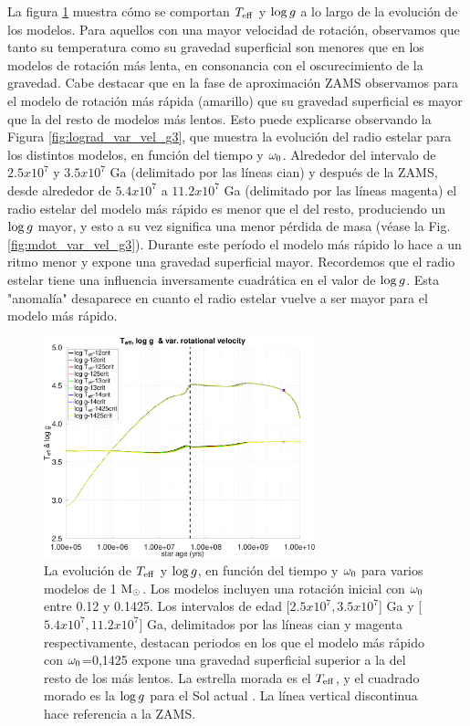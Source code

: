 La figura \ref{fig:teff_logg_var_vel_g3} muestra cómo se comportan $T_{\mathrm{eff}}$ y $\mathrm{log} \, g$ a lo largo de la evolución de los modelos. Para aquellos con una mayor velocidad de rotación, observamos que tanto su temperatura como su gravedad superficial son menores que en los modelos de rotación más lenta, en consonancia con el oscurecimiento de la gravedad. Cabe destacar que en la fase de aproximación ZAMS observamos para el modelo de rotación más rápida (amarillo) que su gravedad superficial es mayor que la del resto de modelos más lentos. Esto puede explicarse observando la Figura \ref{fig:lograd_var_vel_g3}, que muestra la evolución del radio estelar para los distintos modelos, en función del tiempo y $\omega_{\mathrm{0}}$. Alrededor del intervalo de $2.5x10^{7}$ y $3.5x10^{7}$ Ga (delimitado por las líneas cian) y después de la ZAMS, desde alrededor de $5.4x10^{7}$ a $11.2x10^{7}$ Ga (delimitado por las líneas magenta) el radio estelar del modelo más rápido es menor que el del resto, produciendo un $\mathrm{log} \, g$ mayor, y esto a su vez significa una menor pérdida de masa (véase la Fig. \ref{fig:mdot_var_vel_g3}). Durante este período el modelo más rápido lo hace a un ritmo menor y expone una gravedad superficial mayor. Recordemos que el radio estelar tiene una influencia inversamente cuadrática en el valor de $\mathrm{log} \, g$. Esta "anomalía" desaparece en cuanto el radio estelar vuelve a ser mayor para el modelo más rápido.\par


\begin{figure}
	\centering
	\includegraphics[width=0.7\textwidth]{img/paper2/teff_logg_var_vel_g3.pdf}
	\caption{La evolución de $T_{\mathrm{eff}}$ y $\mathrm{log} \, g$, en función del tiempo y $\omega_{\mathrm{0}}$ para varios modelos de 1 $\mathrm{M}_\odot$. Los modelos incluyen una rotación inicial con $\omega_{\mathrm{0}}$ entre 0.12 y 0.1425. Los intervalos de edad [$2.5x10^{7},3.5x10^{7}$] Ga y [$5.4x10^{7},11.2x10^{7}$] Ga, delimitados por las líneas cian y magenta respectivamente, destacan periodos en los que el modelo más rápido con $\omega_{\mathrm{0}}$=0,1425 expone una gravedad superficial superior a la del resto de los más lentos. La estrella morada es el $T_{\mathrm{eff}}$, y el cuadrado morado es la $\mathrm{log} \, g$ para el Sol actual \cite{Gill2012}. La línea vertical discontinua hace referencia a la ZAMS.}
	\label{fig:teff_logg_var_vel_g3}
\end{figure}

